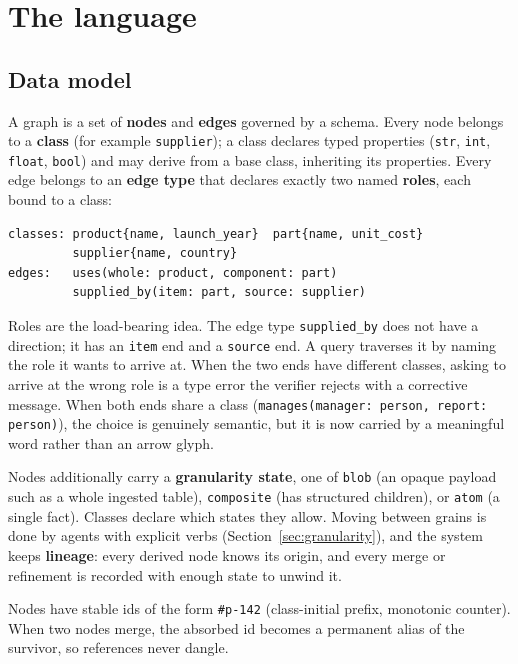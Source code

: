 \documentclass[11pt]{article}
\begin{document}
\section{The language}\label{sec:lang}

\subsection{Data model}

A graph is a set of \textbf{nodes} and \textbf{edges} governed by a schema. Every node belongs to a \textbf{class} (for example \texttt{supplier}); a class declares typed properties (\texttt{str}, \texttt{int}, \texttt{float}, \texttt{bool}) and may derive from a base class, inheriting its properties. Every edge belongs to an \textbf{edge type} that declares exactly two named \textbf{roles}, each bound to a class:

\begin{lstlisting}[style=res]
classes: product{name, launch_year}  part{name, unit_cost}
         supplier{name, country}
edges:   uses(whole: product, component: part)
         supplied_by(item: part, source: supplier)
\end{lstlisting}

Roles are the load-bearing idea. The edge type \texttt{supplied\_by} does not have a direction; it has an \texttt{item} end and a \texttt{source} end. A query traverses it by naming the role it wants to arrive at. When the two ends have different classes, asking to arrive at the wrong role is a type error the verifier rejects with a corrective message. When both ends share a class (\texttt{manages(manager: person, report: person)}), the choice is genuinely semantic, but it is now carried by a meaningful word rather than an arrow glyph.

Nodes additionally carry a \textbf{granularity state}, one of \texttt{blob} (an opaque payload such as a whole ingested table), \texttt{composite} (has structured children), or \texttt{atom} (a single fact). Classes declare which states they allow. Moving between grains is done by agents with explicit verbs (Section~\ref{sec:granularity}), and the system keeps \textbf{lineage}: every derived node knows its origin, and every merge or refinement is recorded with enough state to unwind it.

Nodes have stable ids of the form \texttt{\#p-142} (class-initial prefix, monotonic counter). When two nodes merge, the absorbed id becomes a permanent alias of the survivor, so references never dangle.
\end{document}
